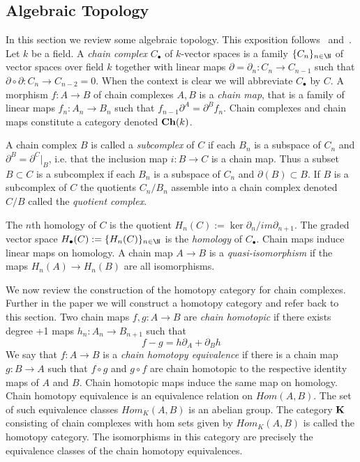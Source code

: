 \subsection{Algebraic Topology}\label{sec:prelims:AT}

In this section we review some algebraic topology.  This exposition follows~\cite{weibel} and~\cite{gelfand}.  Let $k$ be a field.  A {\em chain complex} $C_\bullet$ of $k$-vector spaces is a family $\{C_n\}_{n\in \N}$ of vector spaces over field $k$ together with linear maps $\partial=\partial_n:C_n\to C_{n-1}$ such that $\partial\circ\partial: C_n\to C_{n-2}=0$.  When the context is clear we will abbreviate $C_\bullet$ by $C$.  A morphism $f:A\to B$ of chain complexes $A,B$ is a {\em chain map}, that is a family of linear maps $f_n:A_n\to B_n$ such that $f_{n-1}\partial^A = \partial^B f_n$. Chain complexes and chain maps constitute a category denoted ${\bf Ch}(k)$.  

A chain complex $B$ is called a {\em subcomplex} of $C$ if each $B_n$ is a subspace of $C_n$ and $\partial^B= \partial^C|_B$, i.e. that the inclusion map $i:B\to C$ is a chain map.  Thus a subset $B\subset C$ is a subcomplex if each $B_n$ is a subspace of $C_n$ and $\partial( B)\subset B$.  If $B$ is a subcomplex of $C$ the quotients $C_n/B_n$ assemble into a chain complex denoted $C/B$ called the {\em quotient complex}.   

 The $n$th homology of $C$ is the quotient $H_n(C):= \ker \partial_n/im \partial_{n+1}$.  The graded vector space $H_\bullet(C) := \{H_n(C)\}_{n\in \N}$ is the {\em homology} of $C_\bullet$.  Chain maps induce linear maps on homology.  A chain map $A\to B$ is a {\em quasi-isomorphism} if the maps $H_n(A)\to H_n(B)$ are all isomorphisms.

We now review the construction of the homotopy category for chain complexes.  Further in the paper we will construct a homotopy category and refer back to this section.  Two chain maps $f,g:A\to B$ are {\em chain homotopic} if there exists degree +1 maps $h_n:A_n\to B_{n+1}$ such that $$f-g = h\partial_A+\partial_Bh$$  We say that $f:A\to B$ is a {\em chain homotopy equivalence} if there is a chain map $g:B\to A$ such that $f\circ g$ and $g\circ f$ are chain homotopic to the respective identity maps of $A$ and $B$. Chain homotopic maps induce the same map on homology.   Chain homotopy equivalence is an equivalence relation on $Hom(A,B)$.  The set of such equivalence classes $Hom_K(A,B)$ is an abelian group.  The category ${\bf K}$ consisting of chain complexes with hom sets given by $Hom_K(A,B)$ is called the homotopy category.  The isomorphisms in this category are precisely the equivalence classes of the chain homotopy equivalences.  

